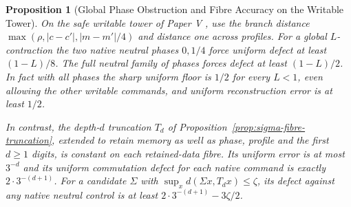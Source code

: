 \documentclass[11pt,a4paper]{article}
\newtheorem{proposition}[theorem]{Proposition}
\theoremstyle{definition}
\begin{document}
\begin{proposition}[Global Phase Obstruction and Fibre Accuracy on the Writable Tower]\label{prop:sigma-tower-defect-floor}
On the safe writable tower of Paper V \cite{paper5}, use the branch distance $\max(\rho,|c-c'|,|m-m'|/4)$ and distance one across profiles. For a global $L$-contraction the two native neutral phases $0,1/4$ force uniform defect at least $(1-L)/8$. The full neutral family of phases forces defect at least $(1-L)/2$. In fact with all phases the sharp uniform floor is $1/2$ for every $L<1$, even allowing the other writable commands, and uniform reconstruction error is at least $1/2$.

In contrast, the depth-$d$ truncation $T_d$ of Proposition~\ref{prop:sigma-fibre-truncation}, extended to retain memory as well as phase, profile and the first $d\ge1$ digits, is constant on each retained-data fibre. Its uniform error is at most $3^{-d}$ and its uniform commutation defect for each native command is exactly $2\cdot3^{-(d+1)}$. For a candidate $\Sigma$ with $\sup_x d(\Sigma x,T_dx)\le\zeta$, its defect against any native neutral control is at least $2\cdot3^{-(d+1)}-3\zeta/2$.
\end{proposition}
\end{document}
